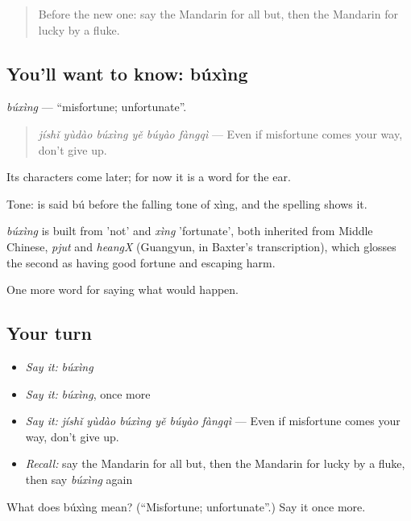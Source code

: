 \begin{quote}
Before the new one: say the Mandarin for all but, then the Mandarin for lucky by a fluke.
\end{quote}

\subsection*{You'll want to know: búxìng}
\emph{búxìng} — \textquotedblleft{}misfortune; unfortunate\textquotedblright{}.

\begin{quote}
\emph{jíshǐ yùdào búxìng yě búyào fàngqì} — Even if misfortune comes your way, don't give up.
\end{quote}

Its characters come later; for now it is a word for the ear.

Tone:  is said bú before the falling tone of xìng, and the spelling shows it.

\begin{cousinweb}
\emph{búxìng} is built from  'not' and \emph{xìng} 'fortunate', both inherited from Middle Chinese, \emph{pjut} and \emph{heangX} (Guangyun, in Baxter's transcription), which glosses the second as having good fortune and escaping harm.
\end{cousinweb}

\begin{grammarlens}[title={What you've built}]
One more word for saying what would happen.
\end{grammarlens}

\subsection*{Your turn}
\begin{itemize}
\raggedright
  \item \emph{Say it:} \emph{búxìng}
  \item \emph{Say it:} \emph{búxìng}, once more
  \item \emph{Say it:} \emph{jíshǐ yùdào búxìng yě búyào fàngqì} — Even if misfortune comes your way, don't give up.
  \item \emph{Recall:} say the Mandarin for all but, then the Mandarin for lucky by a fluke, then say \emph{búxìng} again
\end{itemize}

\begin{tcolorbox}[breakable,colback=teal!4,colframe=teal!35!black,title={Before you move on}]
What does búxìng mean? (\textquotedblleft{}Misfortune; unfortunate\textquotedblright{}.) Say it once more.
\end{tcolorbox}
